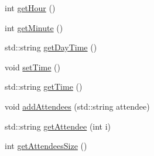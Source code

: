 \begin{DoxyCompactItemize}
\item 
int \hyperlink{classTime_ae0ce1e970c739d756282c95ebe458baf}{get\+Hour} ()
\item 
int \hyperlink{classTime_ad231692eb5f467f28322d75a31bde810}{get\+Minute} ()
\item 
std\+::string \hyperlink{classTime_ab3f43119f952338e691403d07c74d645}{get\+Day\+Time} ()
\item 
void \hyperlink{classTime_a261eacc60c1e3064226557c70a92272d}{set\+Time} ()
\item 
std\+::string \hyperlink{classTime_a96beef6d1d38c96e0f46a10d32b13cac}{get\+Time} ()
\item 
void \hyperlink{classTime_aae92e09d98511afb8a3520b64757d204}{add\+Attendees} (std\+::string attendee)
\item 
std\+::string \hyperlink{classTime_a0ac31cbf8f45f39c8082286afcbe5007}{get\+Attendee} (int i)
\item 
int \hyperlink{classTime_a62ae562ad5f717f14f452ad7dd47325c}{get\+Attendees\+Size} ()
\end{DoxyCompactItemize}
